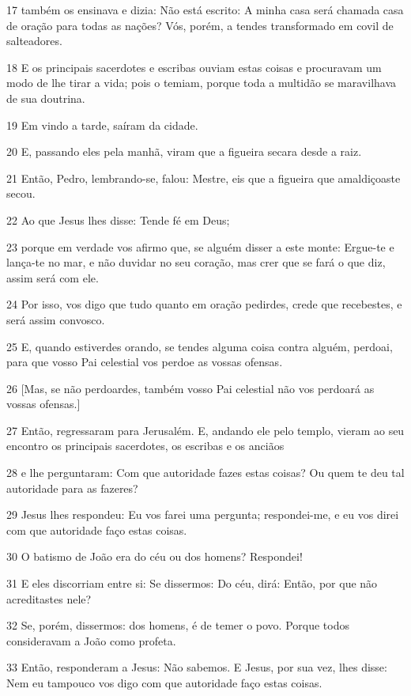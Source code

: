 \par 17 também os ensinava e dizia: Não está escrito: A minha casa será chamada casa de oração para todas as nações? Vós, porém, a tendes transformado em covil de salteadores.
\par 18 E os principais sacerdotes e escribas ouviam estas coisas e procuravam um modo de lhe tirar a vida; pois o temiam, porque toda a multidão se maravilhava de sua doutrina.
\par 19 Em vindo a tarde, saíram da cidade.
\par 20 E, passando eles pela manhã, viram que a figueira secara desde a raiz.
\par 21 Então, Pedro, lembrando-se, falou: Mestre, eis que a figueira que amaldiçoaste secou.
\par 22 Ao que Jesus lhes disse: Tende fé em Deus;
\par 23 porque em verdade vos afirmo que, se alguém disser a este monte: Ergue-te e lança-te no mar, e não duvidar no seu coração, mas crer que se fará o que diz, assim será com ele.
\par 24 Por isso, vos digo que tudo quanto em oração pedirdes, crede que recebestes, e será assim convosco.
\par 25 E, quando estiverdes orando, se tendes alguma coisa contra alguém, perdoai, para que vosso Pai celestial vos perdoe as vossas ofensas.
\par 26 [Mas, se não perdoardes, também vosso Pai celestial não vos perdoará as vossas ofensas.]
\par 27 Então, regressaram para Jerusalém. E, andando ele pelo templo, vieram ao seu encontro os principais sacerdotes, os escribas e os anciãos
\par 28 e lhe perguntaram: Com que autoridade fazes estas coisas? Ou quem te deu tal autoridade para as fazeres?
\par 29 Jesus lhes respondeu: Eu vos farei uma pergunta; respondei-me, e eu vos direi com que autoridade faço estas coisas.
\par 30 O batismo de João era do céu ou dos homens? Respondei!
\par 31 E eles discorriam entre si: Se dissermos: Do céu, dirá: Então, por que não acreditastes nele?
\par 32 Se, porém, dissermos: dos homens, é de temer o povo. Porque todos consideravam a João como profeta.
\par 33 Então, responderam a Jesus: Não sabemos. E Jesus, por sua vez, lhes disse: Nem eu tampouco vos digo com que autoridade faço estas coisas.

